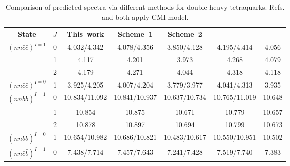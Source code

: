 \documentclass[prd,twocolumn,floatfix,nofootinbib]{revtex4}
\begin{document}
\renewcommand{\tabcolsep}{0.25cm}
\renewcommand{\arraystretch}{1.3}
\begin{table}[!htbp]
    \caption{Comparison of predicted spectra via different methods for double heavy tetraquarks. Refs.\cite{Luo:2017eub} and \cite{Lu:2020rog} both apply CMI model.}
    \label{tab:comparison}
    \begin{tabular}{ccccccc}
        \hline\hline
        {\rm State}     &$J$    &{\rm This\ work}       &\cite{Luo:2017eub} {\rm Scheme\ 1}  &\cite{Luo:2017eub} {\rm Scheme\ 2}  &\cite{Lu:2020rog}      &\cite{Ebert:2007rn} \\ \hline
        ${(nn\bar{c}\bar{c})}^{I=1}$ 
                        &0      &4.032/4.342            &4.078/4.356                         &3.850/4.128                         &4.195/4.414            &4.056 \\ 
                        &1      &4.117                  &4.201                               &3.973                               &4.268                  &4.079 \\ 
                        &2      &4.179                  &4.271                               &4.044                               &4.318                  &4.118 \\ 
        ${(nn\bar{c}\bar{c})}^{I=0}$ 
                        &1      &3.925/4.205            &4.007/4.204                         &3.779/3.977                         &4.041/4.313            &3.935 \\ 
        ${(nn\bar{b}\bar{b})}^{I=1}$ 
                        &0      &10.834/11.092          &10.841/10.937                       &10.637/10.734                       &10.765/11.019          &10.648 \\ 
                        &1      &10.854                 &10.875                              &10.671                              &10.779                 &10.657 \\ 
                        &2      &10.878                 &10.897                              &10.694                              &10.799                 &10.673 \\ 
        ${(nn\bar{b}\bar{b})}^{I=0}$ 
                        &1      &10.654/10.982          &10.686/10.821                       &10.483/10.617                       &10.550/10.951          &10.502 \\ 
        ${(nn\bar{c}\bar{b})}^{I=1}$ 
                        &0      &7.438/7.714            &7.457/7.643                         &7.241/7.428                         &7.519/7.740            &7.383 \\ 

\end{tabular}
\end{table}
\end{document}

